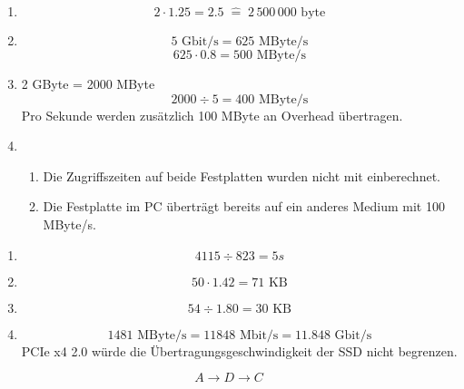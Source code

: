\documentclass[a4paper, 12pt, margins=2cm]{homework}
\begin{document}
  \begin{problem}
  \end{problem}
  \begin{solution}\hfill
    \begin{enumerate}[label=(\alph*)]\itemsep0pt
      \item \[ 2\cdot 1.25 = 2.5\;\widehat{=}\; 2\,500\,000\text{ byte} \]

      \item \[ 5\text{ Gbit/s} = 625\text{ MByte/s} \]
            \[ 625\cdot 0.8 = 500\text{ MByte/s} \]

      \item 2 GByte = 2000 MByte
            \[ 2000\div 5 = 400\text{ MByte/s} \]
            Pro Sekunde werden zusätzlich 100 MByte an Overhead übertragen.

      \item \hfill
        \begin{enumerate}[label=\arabic*.]\itemsep0pt
          \item Die Zugriffszeiten auf beide Festplatten wurden nicht mit einberechnet.
          \item Die Festplatte im PC überträgt bereits auf ein anderes Medium mit 100 MByte/s.
        \end{enumerate}
    \end{enumerate}
  \end{solution}


  \begin{problem}
  \end{problem}
  \begin{solution}\hfill
    \begin{enumerate}[label=(\alph*)]\itemsep0pt
      \item \[ 4115\div 823 = 5s \]
      \item \[ 50\cdot 1.42 = 71\text{ KB} \]
      \item \[ 54\div 1.80 = 30\text{ KB} \]
      \item \[ 1481\text{ MByte/s} = 11848\text{ Mbit/s} = 11.848\text{ Gbit/s} \]
            PCIe x4 2.0 würde die Übertragungsgeschwindigkeit der SSD nicht begrenzen.
    \end{enumerate}
  \end{solution}

\newpage

  \begin{problem}
  \end{problem}
  \begin{solution}\hfill
    \begin{center}
      \def\svgwidth{1\textwidth}
    \end{center}

    \[ A\rightarrow D\rightarrow C \]
  \end{solution}
\end{document}
